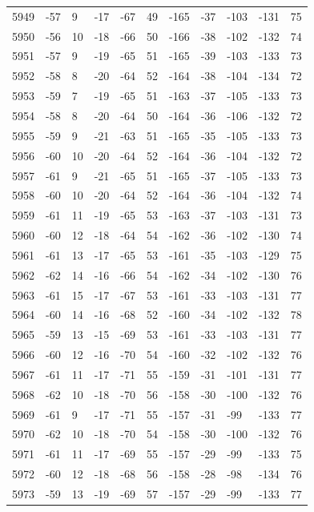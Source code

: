 \begin{table}[H]
\begin{tabular}{lllllllllll}
5949 & -57 & 9 & -17 & -67 & 49 & -165 & -37 & -103 & -131 & 75 \\
5950 & -56 & 10 & -18 & -66 & 50 & -166 & -38 & -102 & -132 & 74 \\
5951 & -57 & 9 & -19 & -65 & 51 & -165 & -39 & -103 & -133 & 73 \\
5952 & -58 & 8 & -20 & -64 & 52 & -164 & -38 & -104 & -134 & 72 \\
5953 & -59 & 7 & -19 & -65 & 51 & -163 & -37 & -105 & -133 & 73 \\
5954 & -58 & 8 & -20 & -64 & 50 & -164 & -36 & -106 & -132 & 72 \\
5955 & -59 & 9 & -21 & -63 & 51 & -165 & -35 & -105 & -133 & 73 \\
5956 & -60 & 10 & -20 & -64 & 52 & -164 & -36 & -104 & -132 & 72 \\
5957 & -61 & 9 & -21 & -65 & 51 & -165 & -37 & -105 & -133 & 73 \\
5958 & -60 & 10 & -20 & -64 & 52 & -164 & -36 & -104 & -132 & 74 \\
5959 & -61 & 11 & -19 & -65 & 53 & -163 & -37 & -103 & -131 & 73 \\
5960 & -60 & 12 & -18 & -64 & 54 & -162 & -36 & -102 & -130 & 74 \\
5961 & -61 & 13 & -17 & -65 & 53 & -161 & -35 & -103 & -129 & 75 \\
5962 & -62 & 14 & -16 & -66 & 54 & -162 & -34 & -102 & -130 & 76 \\
5963 & -61 & 15 & -17 & -67 & 53 & -161 & -33 & -103 & -131 & 77 \\
5964 & -60 & 14 & -16 & -68 & 52 & -160 & -34 & -102 & -132 & 78 \\
5965 & -59 & 13 & -15 & -69 & 53 & -161 & -33 & -103 & -131 & 77 \\
5966 & -60 & 12 & -16 & -70 & 54 & -160 & -32 & -102 & -132 & 76 \\
5967 & -61 & 11 & -17 & -71 & 55 & -159 & -31 & -101 & -131 & 77 \\
5968 & -62 & 10 & -18 & -70 & 56 & -158 & -30 & -100 & -132 & 76 \\
5969 & -61 & 9 & -17 & -71 & 55 & -157 & -31 & -99 & -133 & 77 \\
5970 & -62 & 10 & -18 & -70 & 54 & -158 & -30 & -100 & -132 & 76 \\
5971 & -61 & 11 & -17 & -69 & 55 & -157 & -29 & -99 & -133 & 75 \\
5972 & -60 & 12 & -18 & -68 & 56 & -158 & -28 & -98 & -134 & 76 \\
5973 & -59 & 13 & -19 & -69 & 57 & -157 & -29 & -99 & -133 & 77 \\

\end{tabular}
\end{table}
